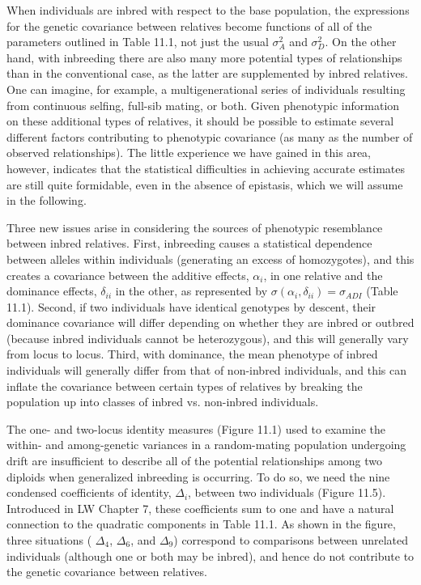 \documentclass{article}
\begin{document}
When individuals are inbred with respect to the base population, the expressions for the genetic covariance between relatives become functions of all of the parameters outlined in Table 11.1, not just the usual  $ \sigma_A^2 $ and  $ \sigma_D^2 $. On the other hand, with inbreeding there are also many more potential types of relationships than in the conventional case, as the latter are supplemented by inbred relatives. One can imagine, for example, a multigenerational series of individuals resulting from continuous selfing, full-sib mating, or both. Given phenotypic information on these additional types of relatives, it should be possible to estimate several different factors contributing to phenotypic covariance (as many as the number of observed relationships). The little experience we have gained in this area, however, indicates that the statistical difficulties in achieving accurate estimates are still quite formidable, even in the absence of epistasis, which we will assume in the following.

Three new issues arise in considering the sources of phenotypic resemblance between inbred relatives. First, inbreeding causes a statistical dependence between alleles within individuals (generating an excess of homozygotes), and this creates a covariance between the additive effects,  $ \alpha_{i} $, in one relative and the dominance effects,  $ \delta_{ii} $ in the other, as represented by  $ \sigma(\alpha_{i}, \delta_{ii}) = \sigma_{ADI} $ (Table 11.1). Second, if two individuals have identical genotypes by descent, their dominance covariance will differ depending on whether they are inbred or outbred (because inbred individuals cannot be heterozygous), and this will generally vary from locus to locus. Third, with dominance, the mean phenotype of inbred individuals will generally differ from that of non-inbred individuals, and this can inflate the covariance between certain types of relatives by breaking the population up into classes of inbred vs. non-inbred individuals.

The one- and two-locus identity measures (Figure 11.1) used to examine the within- and among-genetic variances in a random-mating population undergoing drift are insufficient to describe all of the potential relationships among two diploids when generalized inbreeding is occurring. To do so, we need the nine condensed coefficients of identity,  $ \Delta_i $, between two individuals (Figure 11.5). Introduced in LW Chapter 7, these coefficients sum to one and have a natural connection to the quadratic components in Table 11.1. As shown in the figure, three situations ( $ \Delta_4 $,  $ \Delta_6 $, and  $ \Delta_9 $) correspond to comparisons between unrelated individuals (although one or both may be inbred), and hence do not contribute to the genetic covariance between relatives.
\end{document}
